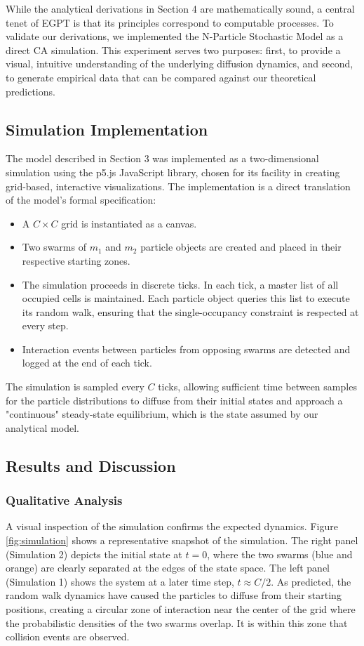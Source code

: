 \documentclass[11pt, letterpaper]{article}
\begin{document}
While the analytical derivations in Section 4 are mathematically sound, a central tenet of EGPT is that its principles correspond to computable processes. To validate our derivations, we implemented the N-Particle Stochastic Model as a direct CA simulation. This experiment serves two purposes: first, to provide a visual, intuitive understanding of the underlying diffusion dynamics, and second, to generate empirical data that can be compared against our theoretical predictions.

\subsection{Simulation Implementation}

The model described in Section 3 was implemented as a two-dimensional simulation using the p5.js JavaScript library, chosen for its facility in creating grid-based, interactive visualizations. The implementation is a direct translation of the model's formal specification:
\begin{itemize}
    \item A $C \times C$ grid is instantiated as a canvas.
    \item Two swarms of $m_1$ and $m_2$ particle objects are created and placed in their respective starting zones.
    \item The simulation proceeds in discrete ticks. In each tick, a master list of all occupied cells is maintained. Each particle object queries this list to execute its random walk, ensuring that the single-occupancy constraint is respected at every step.
    \item Interaction events between particles from opposing swarms are detected and logged at the end of each tick.
\end{itemize}
The simulation is sampled every $C$ ticks, allowing sufficient time between samples for the particle distributions to diffuse from their initial states and approach a "continuous" steady-state equilibrium, which is the state assumed by our analytical model.

\subsection{Results and Discussion}

\subsubsection{Qualitative Analysis}
A visual inspection of the simulation confirms the expected dynamics. Figure \ref{fig:simulation} shows a representative snapshot of the simulation. The right panel (Simulation 2) depicts the initial state at $t=0$, where the two swarms (blue and orange) are clearly separated at the edges of the state space. The left panel (Simulation 1) shows the system at a later time step, $t \approx C/2$. As predicted, the random walk dynamics have caused the particles to diffuse from their starting positions, creating a circular zone of interaction near the center of the grid where the probabilistic densities of the two swarms overlap. It is within this zone that collision events are observed.
\end{document}
